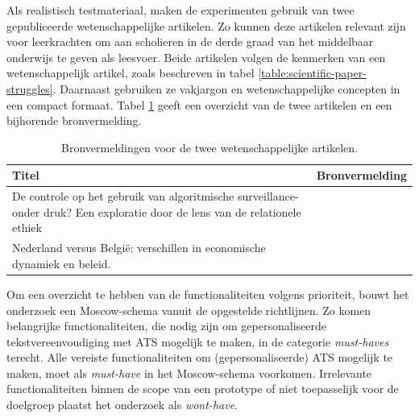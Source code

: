 Als realistisch testmateriaal, maken de experimenten gebruik van twee gepubliceerde wetenschappelijke artikelen. Zo kunnen deze artikelen relevant zijn voor leerkrachten om aan scholieren in de derde graad van het middelbaar onderwijs te geven als leesvoer. Beide artikelen volgen de kenmerken van een wetenschappelijk artikel, zoals beschreven in tabel \ref{table:scientific-paper-struggles}. Daarnaast gebruiken ze vakjargon en wetenschappelijke concepten in een compact formaat. Tabel \ref{table:referentieteksten-bronvermelding} geeft een overzicht van de twee artikelen en een bijhorende bronvermelding.

\begin{center}
	\begin{table}[H]
		\begin{tabular}{ | m{10cm} | m{5cm} | } 
			\hline
			\textbf{Titel} & \textbf{Bronvermelding} \\
			\hline
			De controle op het gebruik van algoritmische surveillance- onder druk? Een exploratie door de lens van de relationele ethiek & \autocite{VanBrakel2022} \\
			\hline
			Nederland versus België: verschillen in economische dynamiek en beleid. & \autocite{Sleuwaegen2022} \\
			\hline
		\end{tabular}
		\caption{Bronvermeldingen voor de twee wetenschappelijke artikelen.}
		\label{table:referentieteksten-bronvermelding}
	\end{table}
\end{center}

Om een overzicht te hebben van de functionaliteiten volgens prioriteit, bouwt het onderzoek een Moscow-schema vanuit de opgestelde richtlijnen. Zo komen belangrijke functionaliteiten, die nodig zijn om gepersonaliseerde tekstvereenvoudiging met ATS mogelijk te maken, in de categorie \textit{must-haves} terecht. Alle vereiste functionaliteiten om (gepersonaliseerde) ATS mogelijk te maken, moet als \textit{must-have} in het Moscow-schema voorkomen. Irrelevante functionaliteiten binnen de scope van een prototype of niet toepasselijk voor de doelgroep plaatst het onderzoek als \textit{wont-have}.

